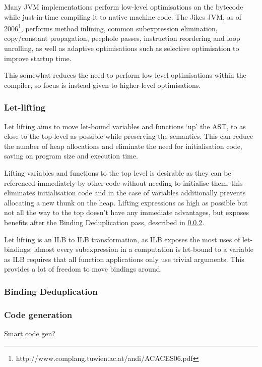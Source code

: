 \documentclass[dissertation.tex]{subfiles}
\begin{document}
{{        Many JVM implementations perform low-level optimisations on the bytecode while just-in-time compiling it to
        native machine code. The Jikes JVM, as of
        2006\footnote{http://www.complang.tuwien.ac.at/andi/ACACES06.pdf}, performs method inlining, common
        subexpression elimination, copy/constant propagation, peephole passes, instruction reordering and loop
        unrolling, as well as adaptive optimisations such as selective optimisation to improve startup time.

        This somewhat reduces the need to perform low-level optimisations within the compiler, so focus is instead given
        to higher-level optimisations.

        \subsubsection{Let-lifting}
        {

            Let lifting aims to move let-bound variables and functions `up' the AST, to as close to the top-level as
            possible while preserving the semantics. This can reduce the number of heap allocations and eliminate the
            need for initialisation code, saving on program size and execution time.

            
            Lifting variables and functions to the top level is desirable as they can be referenced immediately by other
            code without needing to initialise them: this eliminates initialisation code and in the case of variables
            additionally prevents allocating a new thunk on the heap. Lifting expressions as high as possible but not
            all the way to the top doesn't have any immediate advantages, but exposes benefits after the Binding
            Deduplication pass, described in \ref{sec:binding-dedupe}.

            Let lifting is an ILB to ILB transformation, as ILB exposes the most uses of let-bindings: almost every
            subexpression in a computation is let-bound to a variable as ILB requires that all function applications
            only use trivial arguments. This provides a lot of freedom to move bindings around.


        }
        \subsubsection{Binding Deduplication}\label{sec:binding-dedupe}
        {

            

        }
        \subsubsection{Code generation}
        {

            Smart code gen?

        }
    }
}
\end{document}
